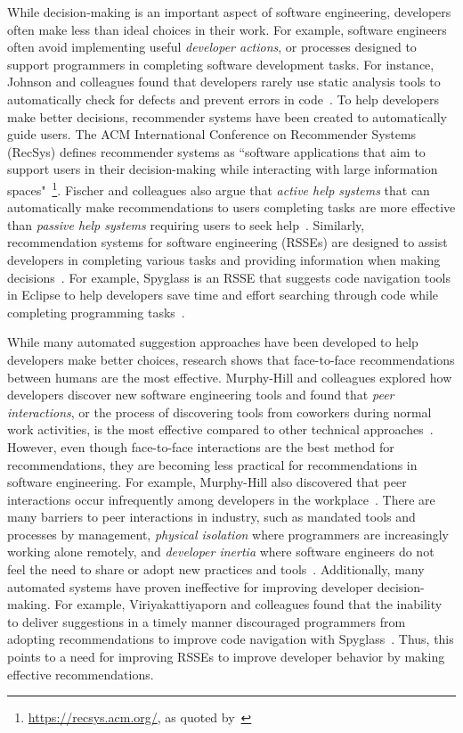 While decision-making is an important aspect of software engineering, developers often make less than ideal choices in their work. For example, software engineers often avoid implementing useful \textit{developer actions}, or processes designed to support programmers in completing software development tasks. For instance, Johnson and colleagues found that developers rarely use static analysis tools to automatically check for defects and prevent errors in code~\cite{Johnson2013Why}. To help developers make better decisions, recommender systems have been created to automatically guide users. The ACM International Conference on Recommender Systems (RecSys) defines recommender systems as ``software applications that aim to support users in their decision-making while interacting with large information spaces"~\footnote{\url{https://recsys.acm.org/}, as quoted by~\cite{RSSE}}. Fischer and colleagues also argue that \textit{active help systems} that can automatically make recommendations to users completing tasks are more effective than \textit{passive help systems} requiring users to seek help~\cite{Fischer1984ActiveHelpSystems}. Similarly, recommendation systems for software engineering (RSSEs) are designed to assist developers in completing various tasks and providing information when making decisions~\cite{RSSE}. For example, Spyglass is an RSSE that suggests code navigation tools in Eclipse to help developers save time and effort searching through code while completing programming tasks~\cite{Spyglass}. 

While many automated suggestion approaches have been developed to help developers make better choices, research shows that face-to-face recommendations between humans are the most effective. Murphy-Hill and colleagues explored how developers discover new software engineering tools and found that \textit{peer interactions}, or the process of discovering tools from coworkers during normal work activities, is the most effective compared to other technical approaches~\cite{Murphy-Hill2011PeerInteraction}. However, even though face-to-face interactions are the best method for recommendations, they are becoming less practical for recommendations in software engineering. For example, Murphy-Hill also discovered that peer interactions occur infrequently among developers in the workplace~\cite{Murphy-Hill2011PeerInteraction}. There are many barriers to peer interactions in industry, such as mandated tools and processes by management, \textit{physical isolation} where programmers are increasingly working alone remotely, and \textit{developer inertia} where software engineers do not feel the need to share or adopt new practices and tools~\cite{Murphy-Hill2015HowDoUsers}. Additionally, many automated systems have proven ineffective for improving developer decision-making. For example, Viriyakattiyaporn and colleagues found that the inability to deliver suggestions in a timely manner discouraged programmers from adopting recommendations to improve code navigation with Spyglass~\cite{viriyakattiyaporn2009challenges}. Thus, this points to a need for improving RSSEs to improve developer behavior by making effective recommendations.

